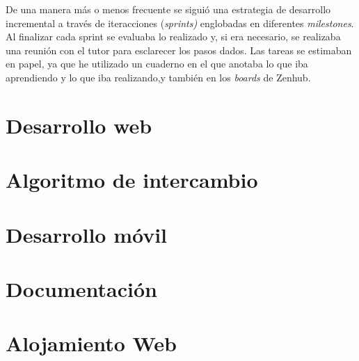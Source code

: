  
 De una manera más o menos frecuente se siguió una estrategia de desarrollo incremental a través de iteracciones (\emph{sprints)} englobadas en diferentes \emph{milestones}. Al finalizar cada sprint se evaluaba lo realizado y, si era necesario, se realizaba una reunión con el tutor para esclarecer los pasos dados. Las tareas se estimaban en papel, ya que he utilizado un cuaderno en el que anotaba lo que iba aprendiendo y lo que iba realizando,y también en  los \emph{boards} de Zenhub. 
 
   \section{Desarrollo web}\label{dweb}
   
   \section{Algoritmo de intercambio}\label{algoritmo}
   
   \section{Desarrollo móvil}\label{dapp}
   
   \section{Documentación}\label{docs}
   
   \section{Alojamiento Web}\label{alojamiento}
 
 